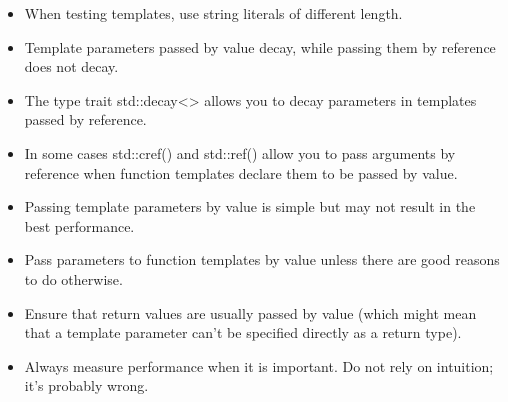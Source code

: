 
\begin{itemize}
\item 
When testing templates, use string literals of different length.

\item 
Template parameters passed by value decay, while passing them by reference does not decay.

\item 
The type trait std::decay<> allows you to decay parameters in templates passed by reference.

\item 
In some cases std::cref() and std::ref() allow you to pass arguments by reference when function templates declare them to be passed by value.

\item 
Passing template parameters by value is simple but may not result in the best performance.

\item 
Pass parameters to function templates by value unless there are good reasons to do otherwise.

\item 
Ensure that return values are usually passed by value (which might mean that a template parameter can’t be specified directly as a return type).

\item 
Always measure performance when it is important. Do not rely on intuition; it’s probably wrong.
\end{itemize}